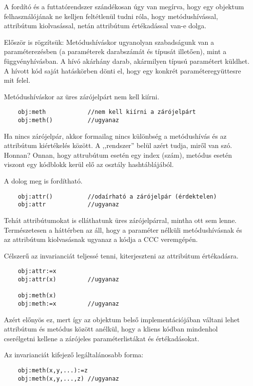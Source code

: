 A fordító és a futtatórendszer szándékosan úgy van megírva,
hogy egy objektum felhasználójának ne kelljen feltétlenül tudni róla,
hogy metódushívással, attribútum kiolvasással, netán attribútum értékadással
van-e dolga.

Először is rögzítsük: Metódushíváskor ugyanolyan szabadságunk van 
a paraméterezésben (a paraméterek darabszámát és típusát illetően), mint 
a függvényhívásban. A hívó akárhány darab, akármilyen típusú paramétert küldhet. 
A hívott kód saját hatáskörben dönti el, hogy egy konkrét paraméteregyüttesre 
mit felel.


Metódushíváskor az üres zárójelpárt nem kell kiírni.
\begin{verbatim}
    obj:meth            //nem kell kiírni a zárójelpárt
    obj:meth()          //ugyanaz
\end{verbatim}
Ha nincs zárójelpár, akkor formailag nincs különbség
a metódushívás és az attribútum kiértékelés között. A ,,rendszer''
belül azért tudja, miről van szó. Honnan? Onnan, hogy attrubútum esetén
egy index (szám), metódus esetén viszont egy kódblokk kerül elő az
osztály hashtáblájából.

A dolog meg is fordítható.
\begin{verbatim}
    obj:attr()          //odaírható a zárójelpár (érdektelen)
    obj:attr            //ugyanaz
\end{verbatim}
Tehát attribútumokat is elláthatunk üres zárójelpárral, mintha ott sem lenne.
Természetesen a háttérben az áll, hogy
a paraméter nélküli metódushívásnak 
és az attribútum kiolvasásnak
ugyanaz a kódja  a CCC veremgépén.

Célszerű az invarianciát teljessé tenni, kiterjeszteni
az attribútum értékadásra.
\begin{verbatim}
    obj:attr:=x
    obj:attr(x)         //ugyanaz

    obj:meth(x)
    obj:meth:=x         //ugyanaz
\end{verbatim}
Azért előnyös ez, mert így az objektum belső implementációjában
váltani lehet attribútum és metódus között anélkül, hogy a kliens kódban
mindenhol cserélgetni kellene a zárójeles paraméterlistákat és értékadásokat.

Az invarianciát kifejező legáltalánosabb forma:
\begin{verbatim}
    obj:meth(x,y,...):=z 
    obj:meth(x,y,...,z) //ugyanaz
\end{verbatim}



